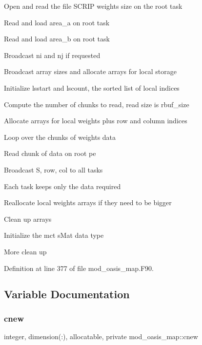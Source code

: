 \begin{DoxyItemize}
\item Open and read the file S\+C\+R\+IP weights size on the root task
\item Read and load area\+\_\+a on root task
\item Read and load area\+\_\+b on root task
\item Broadcast ni and nj if requested
\item Broadcast array sizes and allocate arrays for local storage
\item Initialize lsstart and lscount, the sorted list of local indices
\item Compute the number of chunks to read, read size is rbuf\+\_\+size
\item Allocate arrays for local weights plus row and column indices
\item Loop over the chunks of weights data
\begin{DoxyItemize}
\item Read chunk of data on root pe
\item Broadcast S, row, col to all tasks
\item Each task keeps only the data required
\item Reallocate local weights arrays if they need to be bigger
\end{DoxyItemize}
\item Clean up arrays
\item Initialize the mct s\+Mat data type
\item More clean up 
\end{DoxyItemize}

Definition at line 377 of file mod\+\_\+oasis\+\_\+map.\+F90.



\subsection{Variable Documentation}
\mbox{\label{namespacemod__oasis__map_a8ae737bd62499fe60ebb48d04ad3b6dd}} 
\subsubsection{\texorpdfstring{cnew}{cnew}}
{\footnotesize\ttfamily integer, dimension(\+:), allocatable, private mod\+\_\+oasis\+\_\+map\+::cnew\hspace{0.3cm}{\ttfamily [private]}}




